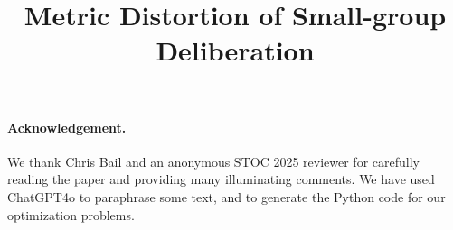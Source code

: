 \documentclass[sigconf,screen]{acmart}
\begin{document}
\title{Metric Distortion of Small-group Deliberation}%





\maketitle

















\paragraph{Acknowledgement.} We thank Chris Bail and an anonymous STOC 2025 reviewer for carefully reading the paper and providing many illuminating comments. We have used ChatGPT4o to paraphrase some text, and to generate the Python code for our optimization problems. 

\newpage


\end{document}
